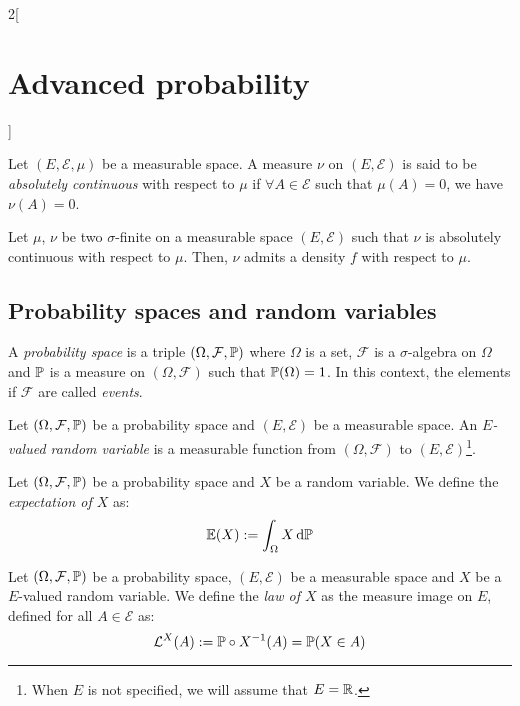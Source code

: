 \documentclass[../../../main_math.tex]{subfiles}
\begin{document}
\begin{multicols}{2}[\section{Advanced probability}]
\begin{definition}
  \end{definition}
  \begin{definition}
    Let $(E,\mathcal{E},\mu)$ be a measurable space. A measure $\nu$ on $(E,\mathcal{E})$ is said to be \emph{absolutely continuous} with respect to $\mu$ if $\forall A\in\mathcal{E}$ such that $\mu(A)=0$, we have $\nu(A)=0$.
  \end{definition}
  \begin{theorem}
    Let $\mu$, $\nu$ be two $\sigma$-finite on  a measurable space $(E,\mathcal{E})$ such that $\nu$ is absolutely continuous with respect to $\mu$. Then, $\nu$ admits a density $f$ with respect to $\mu$.
  \end{theorem}
  \subsection{Probability spaces and random variables}
  \begin{definition}
    A \emph{probability space} is a triple $(\Omega,\mathcal{F},\mathbb{P})$ where $\Omega$ is a set, $\mathcal{F}$ is a $\sigma$-algebra on $\Omega$ and $\mathbb{P}$ is a measure on $(\Omega,\mathcal{F})$ such that $\mathbb{P}(\Omega)=1$. In this context, the elements if $\mathcal{F}$ are called \emph{events}.
  \end{definition}
  \begin{definition}
    Let $(\Omega,\mathcal{F},\mathbb{P})$ be a probability space and $(E,\mathcal{E})$ be a measurable space. An \emph{$E$-valued random variable} is a measurable function from $(\Omega,\mathcal{F})$ to $(E,\mathcal{E})$\footnote{When $E$ is not specified, we will assume that $E=\mathbb{R}$.}.
  \end{definition}
  \begin{definition}[Expectation]
    Let $(\Omega,\mathcal{F},\mathbb{P})$ be a probability space and $X$ be a random variable. We define the \emph{expectation of $X$} as:
    $$
      \mathbb{E}(X):=\int_\Omega{X\dd{\ensuremath{\mathbb{P}}}}
    $$
  \end{definition}
  \begin{definition}
    Let $(\Omega,\mathcal{F},\mathbb{P})$ be a probability space, $(E,\mathcal{E})$ be a measurable space and $X$ be a $E$-valued random variable. We define the \emph{law of $X$} as the measure image on $E$, defined for all $A\in\mathcal{E}$ as:
    $$
      \mathcal{L}^X(A):=\mathbb{P}\circ X^{-1}(A)=\mathbb{P}(X\in A)
    $$
  \end{definition}
  \begin{proposition}

\end{proposition}
\end{multicols}
\end{document}
